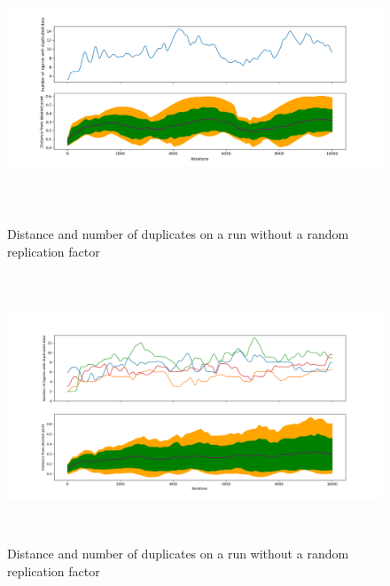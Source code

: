 \documentclass{UoYCSproject}
\begin{document}
\begin{figure}[htb]
\label{fig:Data1}
\begin{center}
\centering
\includegraphics[width=\linewidth, height=8cm]{"./SimpleSuicRep_m4_r0.5_c1_n50.png"}
\caption{Distance and number of duplicates on a run without a random replication factor}
\end{center}
\end{figure}

\begin{figure}[htb]
\label{fig:Data2}
\begin{center}
\centering
\includegraphics[width=\linewidth, height=8cm]{"./SimpleSuicideReplication_4d_4m_0.5r_50n.png"}
\caption{Distance and number of duplicates on a run without a random replication factor}
\end{center}
\end{figure}
\end{document}
